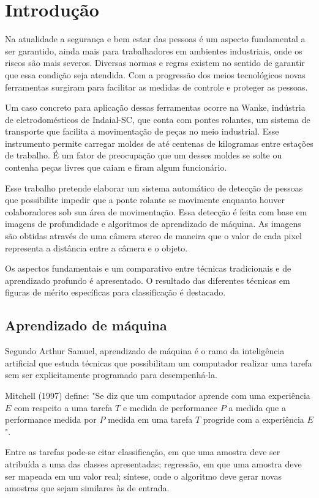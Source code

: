 \chapter{Introdução}

Na atualidade a segurança e bem estar das pessoas é um aspecto fundamental a ser garantido, ainda mais para trabalhadores em ambientes industriais, onde os riscos são mais severos. Diversas normas e regras existem no sentido de garantir que essa condição seja atendida. Com a progressão dos meios tecnológicos novas ferramentas surgiram para facilitar as medidas de controle e proteger as pessoas.

Um caso concreto para aplicação dessas ferramentas ocorre na Wanke, indústria de eletrodomésticos de Indaial-SC, que conta com pontes rolantes, um sistema de transporte que facilita a movimentação de peças no meio industrial. Esse instrumento permite carregar moldes de até centenas de kilogramas entre estações de trabalho. É um fator de preocupação que um desses moldes se solte ou contenha peças livres que caiam e firam algum funcionário. 

Esse trabalho pretende elaborar um sistema automático de detecção de pessoas que possibilite impedir que a ponte rolante se movimente enquanto houver colaboradores sob sua área de movimentação. Essa detecção é feita com base em imagens de profundidade e algoritmos de aprendizado de máquina. As imagens são obtidas através de uma câmera stereo de maneira que o valor de cada pixel representa a distância entre a câmera e o objeto. 

Os aspectos fundamentais e um comparativo entre técnicas tradicionais e de aprendizado profundo é apresentado. O resultado das diferentes técnicas em figuras de mérito específicas para classificação é destacado.

\section{Aprendizado de máquina}
Segundo Arthur Samuel, aprendizado de máquina é o ramo da inteligência artificial que estuda técnicas que possibilitam um computador realizar uma tarefa sem ser explicitamente programado para desempenhá-la. 

Mitchell (1997) define: "Se diz que um computador aprende com uma experiência $E$ com respeito a uma tarefa $T$ e medida de performance $P$ a medida que a performance medida por $P$ medida em uma tarefa $T$ progride com a experiência $E$". 

Entre as tarefas pode-se citar classificação, em que uma amostra deve ser atribuída a uma das classes apresentadas; regressão, em que uma amostra deve ser mapeada em um valor real; síntese, onde o algoritmo deve gerar novas amostras que sejam similares às de entrada.

